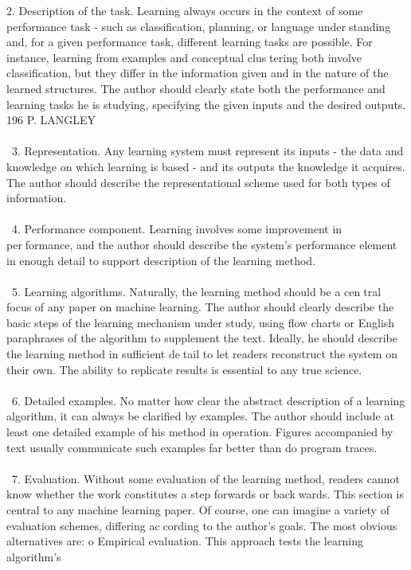 \documentclass{article}
\begin{document}
2. Description of the task. Learning always occurs in the context of some
performance task - such as classification, planning, or language understanding and, for a given performance task, different learning tasks
are possible. For instance, learning from examples and conceptual clustering both involve classification, but they differ in the information
given and in the nature of the learned structures. The author should
clearly state both the performance and learning tasks he is studying,
specifying the given inputs and the desired outputs.
196 P. LANGLEY \\\\\
3. Representation. Any learning system must represent its inputs - the
data and knowledge on which learning is based - and its outputs the
knowledge it acquires. The author should describe the representational
scheme used for both types of information.\\\\\
4. Performance component. Learning involves some improvement in performance, and the author should describe the system's performance
element in enough detail to support description of the learning method.\\\\\
5. Learning algorithms. Naturally, the learning method should be a central focus of any paper on machine learning. The author should clearly
describe the basic steps of the learning mechanism under study, using
flow charts or English paraphrases of the algorithm to supplement the
text. Ideally, he should describe the learning method in sufficient detail to let readers reconstruct the system on their own. The ability to
replicate results is essential to any true science.\\\\\
6. Detailed examples. No matter how clear the abstract description of a
learning algorithm, it can always be clarified by examples. The author
should include at least one detailed example of his method in operation.
Figures accompanied by text usually communicate such examples far
better than do program traces.\\\\\
7. Evaluation. Without some evaluation of the learning method, readers
cannot know whether the work constitutes a step forwards or backwards. This section is central to any machine learning paper. Of
course, one can imagine a variety of evaluation schemes, differing according to the author's goals. The most obvious alternatives are:
o Empirical evaluation. This approach tests the learning algorithm's
\end{document}
